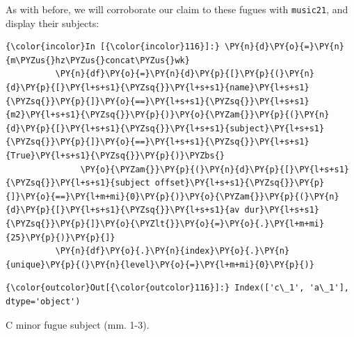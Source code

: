 As with before, we will corroborate our claim to these fugues with
\texttt{music21}, and display their subjects:

    \begin{Verbatim}[commandchars=\\\{\}]
{\color{incolor}In [{\color{incolor}116}]:} \PY{n}{d}\PY{o}{=}\PY{n}{m\PYZus{}hz\PYZus{}concat\PYZus{}wk}
          \PY{n}{df}\PY{o}{=}\PY{n}{d}\PY{p}{[}\PY{p}{(}\PY{n}{d}\PY{p}{[}\PY{l+s+s1}{\PYZsq{}}\PY{l+s+s1}{name}\PY{l+s+s1}{\PYZsq{}}\PY{p}{]}\PY{o}{==}\PY{l+s+s1}{\PYZsq{}}\PY{l+s+s1}{m2}\PY{l+s+s1}{\PYZsq{}}\PY{p}{)}\PY{o}{\PYZam{}}\PY{p}{(}\PY{n}{d}\PY{p}{[}\PY{l+s+s1}{\PYZsq{}}\PY{l+s+s1}{subject}\PY{l+s+s1}{\PYZsq{}}\PY{p}{]}\PY{o}{==}\PY{l+s+s1}{\PYZsq{}}\PY{l+s+s1}{True}\PY{l+s+s1}{\PYZsq{}}\PY{p}{)}\PYZbs{}
               \PY{o}{\PYZam{}}\PY{p}{(}\PY{n}{d}\PY{p}{[}\PY{l+s+s1}{\PYZsq{}}\PY{l+s+s1}{subject offset}\PY{l+s+s1}{\PYZsq{}}\PY{p}{]}\PY{o}{==}\PY{l+m+mi}{0}\PY{p}{)}\PY{o}{\PYZam{}}\PY{p}{(}\PY{n}{d}\PY{p}{[}\PY{l+s+s1}{\PYZsq{}}\PY{l+s+s1}{av dur}\PY{l+s+s1}{\PYZsq{}}\PY{p}{]}\PY{o}{\PYZlt{}}\PY{o}{=}\PY{o}{.}\PY{l+m+mi}{25}\PY{p}{)}\PY{p}{]}
          \PY{n}{df}\PY{o}{.}\PY{n}{index}\PY{o}{.}\PY{n}{unique}\PY{p}{(}\PY{n}{level}\PY{o}{=}\PY{l+m+mi}{0}\PY{p}{)}
\end{Verbatim}
\begin{Verbatim}[commandchars=\\\{\}]
{\color{outcolor}Out[{\color{outcolor}116}]:} Index(['c\_1', 'a\_1'], dtype='object')
\end{Verbatim}


\begin{Example}[H]
\vspace{1.5em}
    \centering
    \caption{ C minor fugue subject (mm. 1-3). }
\end{Example}    


